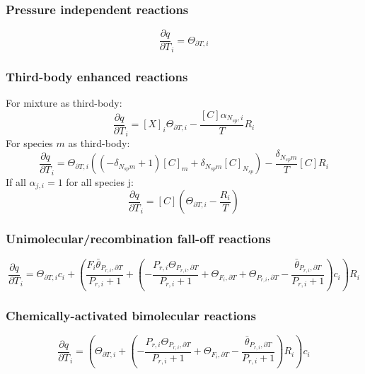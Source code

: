 \documentclass[a4paper,10pt]{article}
\newcommand{\ns}{N_{sp}}
\begin{document}
\subsubsection{Pressure independent reactions}
\begin{dmath} \frac{\partial q }{\partial T }_{i} = \Theta_{\partial T, i}\end{dmath} 
\subsubsection{Third-body enhanced reactions}
For mixture as third-body:
\begin{dmath} \frac{\partial q }{\partial T }_{i} = [X]_{i} \Theta_{\partial T, i} - \frac{[C] \alpha_{\ns,i}}{T} R_{i}\end{dmath} 
For species $m$ as third-body:
\begin{dmath} \frac{\partial q }{\partial T }_{i} = \Theta_{\partial T, i} \left(\left(- \delta_{\ns m} + 1\right) [C]_{m} + \delta_{\ns m} [C]_{\ns}\right) - \frac{\delta_{\ns m}}{T} [C] R_{i}\end{dmath} 
If all $\alpha_{j,i} = 1$ for all species j:
\begin{dmath} \frac{\partial q }{\partial T }_{i} = [C] \left(\Theta_{\partial T, i} - \frac{R_{i}}{T}\right)\end{dmath} 
\subsubsection{Unimolecular\slash recombination fall-off reactions}
\begin{dmath} \frac{\partial q }{\partial T }_{i} = \Theta_{\partial T, i} c_{i} + \left(\frac{F_{i} \bar{\theta}_{P_{r, i}, \partial T}}{P_{r, i} + 1} + \left(- \frac{P_{r, i} \Theta_{P_{r,i}, \partial T}}{P_{r, i} + 1} + \Theta_{F_i, \partial T} + \Theta_{P_{r,i}, \partial T} - \frac{\bar{\theta}_{P_{r, i}, \partial T}}{P_{r, i} + 1}\right) c_{i}\right) R_{i}\end{dmath} 
\subsubsection{Chemically-activated bimolecular reactions}
\begin{dmath} \frac{\partial q }{\partial T }_{i} = \left(\Theta_{\partial T, i} + \left(- \frac{P_{r, i} \Theta_{P_{r,i}, \partial T}}{P_{r, i} + 1} + \Theta_{F_i, \partial T} - \frac{\bar{\theta}_{P_{r, i}, \partial T}}{P_{r, i} + 1}\right) R_{i}\right) c_{i}\end{dmath} 
\end{document}
